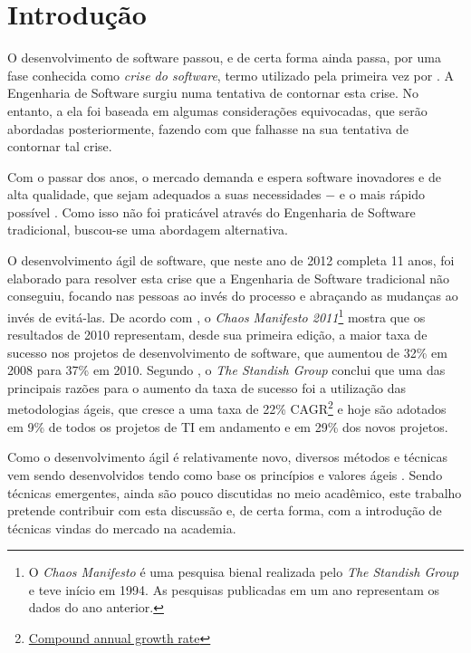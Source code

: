 \chapter{Introdução}

O desenvolvimento de software passou, e de certa forma ainda passa, por uma fase conhecida como \emph{crise do software}, termo utilizado pela primeira vez por . A Engenharia de Software surgiu \cite{NaurRandell} numa tentativa de contornar esta crise. No entanto, a ela foi baseada em algumas considerações equivocadas, que serão abordadas posteriormente, fazendo com que falhasse na sua tentativa de contornar tal crise.

Com o passar dos anos, o mercado demanda e espera software inovadores e de alta qualidade, que sejam adequados a suas necessidades $-$ e o mais rápido possível \cite{TheBusinessOfInnovation}. Como isso não foi praticável através do Engenharia de Software tradicional, buscou-se uma abordagem alternativa.

O desenvolvimento ágil de software, que neste ano de 2012 completa 11 anos, foi elaborado \cite{AgileManifesto} para resolver esta crise que a Engenharia de Software tradicional não conseguiu, focando nas pessoas ao invés do processo e abraçando as mudanças ao invés de evitá-las. De acordo com , o \textit{Chaos Manifesto 2011}\footnote{O \textit{Chaos Manifesto} é uma pesquisa bienal realizada pelo \textit{The Standish Group} e teve início em 1994. As pesquisas publicadas em um ano representam os dados do ano anterior.} mostra que os resultados de 2010 representam, desde sua primeira edição, a maior taxa de sucesso nos projetos de desenvolvimento de software, que aumentou de 32\% em 2008 para 37\% em 2010. Segundo , o \textit{The Standish Group} conclui que uma das principais razões para o aumento da taxa de sucesso foi a utilização das metodologias ágeis, que cresce a uma taxa de 22\% CAGR\footnote{\href{http://en.wikipedia.org/wiki/Compound_annual_growth_rate} {Compound annual growth rate}} e hoje são adotados em 9\% de todos os projetos de TI em andamento e em 29\% dos novos projetos.

Como o desenvolvimento ágil é relativamente novo, diversos métodos e técnicas vem sendo desenvolvidos tendo como base os princípios e valores ágeis \cite{BDDRodrigo}. Sendo técnicas emergentes, ainda são pouco discutidas no meio acadêmico, este trabalho pretende contribuir com esta discussão e, de certa forma, com a introdução de técnicas vindas do mercado na academia.


